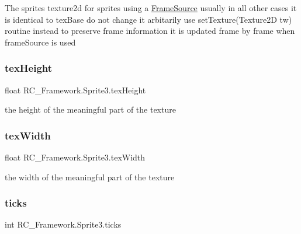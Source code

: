 The sprites texture2d for sprites using a \mbox{\hyperlink{class_r_c___framework_1_1_frame_source}{Frame\+Source}} usually in all other cases it is identical to tex\+Base do not change it arbitarily use set\+Texture(\+Texture2\+D tw) routine instead to preserve frame information it is updated frame by frame when frame\+Source is used 

\mbox{\label{class_r_c___framework_1_1_sprite3_a66c1c4d6d47a86970961d4ba041acfce}} 
\subsubsection{\texorpdfstring{tex\+Height}{texHeight}}
{\footnotesize\ttfamily float R\+C\+\_\+\+Framework.\+Sprite3.\+tex\+Height\hspace{0.3cm}{\ttfamily [protected]}}



the height of the meaningful part of the texture 

\mbox{\label{class_r_c___framework_1_1_sprite3_a6155a73405919a9651d0d38e47dca233}} 
\subsubsection{\texorpdfstring{tex\+Width}{texWidth}}
{\footnotesize\ttfamily float R\+C\+\_\+\+Framework.\+Sprite3.\+tex\+Width\hspace{0.3cm}{\ttfamily [protected]}}



the width of the meaningful part of the texture 

\mbox{\label{class_r_c___framework_1_1_sprite3_a59474528cccad4b750e2b72a5f8cf585}} 
\subsubsection{\texorpdfstring{ticks}{ticks}}
{\footnotesize\ttfamily int R\+C\+\_\+\+Framework.\+Sprite3.\+ticks\hspace{0.3cm}{\ttfamily [protected]}}



